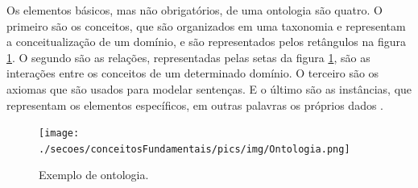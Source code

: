 Os elementos básicos, mas não obrigatórios, de uma ontologia são quatro. O primeiro são os conceitos, que são organizados em uma taxonomia e representam a conceitualização de um domínio, e são representados pelos retângulos na figura \ref{figura_ontologia}. O segundo são as relações, representadas pelas setas da figura \ref{figura_ontologia}, são as interações entre os conceitos de um determinado domínio. O terceiro são os axiomas que são usados para modelar sentenças. E o último são as instâncias, que representam os elementos específicos, em outras palavras os próprios dados \cite{ALMEIDA2003}. 
\begin{figure}[!hbt]
    \centering   
    \caption{Exemplo de ontologia.}
    \texttt{[image: ./secoes/conceitosFundamentais/pics/img/Ontologia.png]}
	\label{figura_ontologia}
\end{figure}

